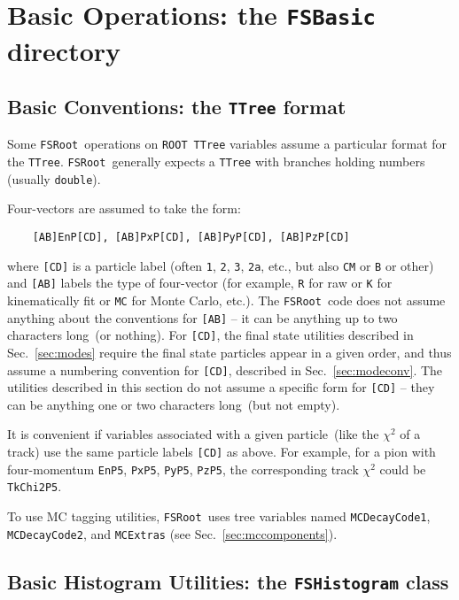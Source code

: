 \documentclass[11pt]{article}
\newcommand{\FSR}{{\tt FSRoot}}
\newcommand{\ROOT}{{\tt ROOT}}
\begin{document}
\section{Basic Operations:  the {\tt FSBasic} directory}

\subsection{Basic Conventions: the {\tt TTree} format}
\label{sec:conventions}

Some \FSR\ operations on \ROOT\ {\tt TTree} variables assume a particular format for the {\tt TTree}.  \FSR\ generally expects a {\tt TTree} with branches holding numbers (usually {\tt double}).

Four-vectors are assumed to take the form:
\begin{verbatim}
    [AB]EnP[CD], [AB]PxP[CD], [AB]PyP[CD], [AB]PzP[CD]
\end{verbatim}
where {\tt [CD]} is a particle label (often {\tt 1}, {\tt 2}, {\tt 3}, {\tt 2a}, etc., but also {\tt CM} or {\tt B} or other) and {\tt [AB]} labels the type of four-vector (for example, {\tt R} for raw or {\tt K} for kinematically fit or {\tt MC} for Monte Carlo, etc.).  The \FSR\ code does not assume anything about the conventions for {\tt [AB]} -- it can be anything up to two characters long~(or nothing).  For {\tt [CD]}, the final state utilities described in Sec.~\ref{sec:modes} require the final state particles appear in a given order, and thus assume a numbering convention for {\tt [CD]}, described in Sec.~\ref{sec:modeconv}.  The utilities described in this section do not assume a specific form for {\tt [CD]} -- they can be anything one or two characters long~(but not empty).

It is convenient if variables associated with a given particle~(like the $\chi^2$ of a track) use the same particle labels {\tt [CD]} as above.  For example, for a pion with four-momentum {\tt EnP5}, {\tt PxP5}, {\tt PyP5}, {\tt PzP5}, the corresponding track $\chi^2$ could be {\tt TkChi2P5}.

To use MC tagging utilities, \FSR\ uses tree variables named {\tt MCDecayCode1}, {\tt MCDecayCode2}, and {\tt MCExtras} (see Sec.~\ref{sec:mccomponents}).


\subsection{Basic Histogram Utilities: the {\tt FSHistogram} class}
\label{sec:hist}
\end{document}
